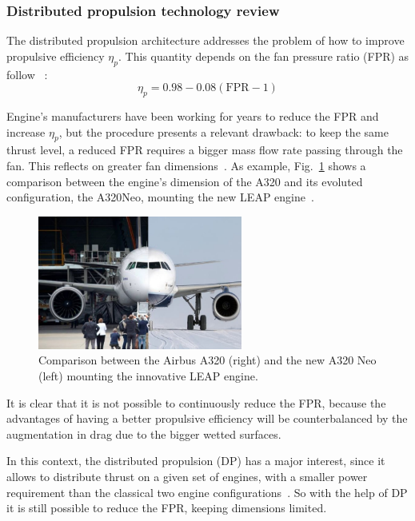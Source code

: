 \subsubsection{Distributed propulsion technology review}
\label{subsubsec:chap1_dep_review}

The distributed propulsion architecture addresses the problem of how to improve propulsive efficiency $\eta_p$.
This quantity depends on the fan pressure ratio (FPR) as follow ~\cite{bib:felder_2009}:
\begin{equation}
	\label{eq:prop_eff_fpr}
	\eta_p = 0.98 - 0.08\left(\textrm{FPR}-1\right)
\end{equation}

Engine's manufacturers have been working for years to reduce the FPR and increase $\eta_p$, but the procedure presents a relevant drawback: to keep the same thrust level, a reduced FPR requires a bigger mass flow rate passing through the fan.
This reflects on greater fan dimensions~\cite{bib:dragon}.
As example, Fig.~\ref{fig:a320_engine_comparison} shows a comparison between the engine's dimension of the A320 and its evoluted configuration, the A320Neo, mounting the new LEAP engine~\cite{bib:leap_engine}.
\begin{figure}[!h]
	\centering
	\includegraphics[keepaspectratio, width=0.6\textwidth]{images/chap1/a320_engine_comparison.jpg}
	\caption{Comparison between the Airbus A320 (right) and the new A320 Neo (left) mounting the innovative LEAP engine.}
	\label{fig:a320_engine_comparison}
\end{figure}
It is clear that it is not possible to continuously reduce the FPR, because the advantages of having a better propulsive efficiency will be counterbalanced by the augmentation in drag due to the bigger wetted surfaces. 

In this context, the distributed propulsion (DP) has a major interest, since it allows to distribute thrust on a given set of engines, with a smaller power requirement than the classical two engine configurations~\cite{bib:ko, bib:kirner, bib:dragon}. 
So with the help of DP it is still possible to reduce the FPR, keeping dimensions limited. 

